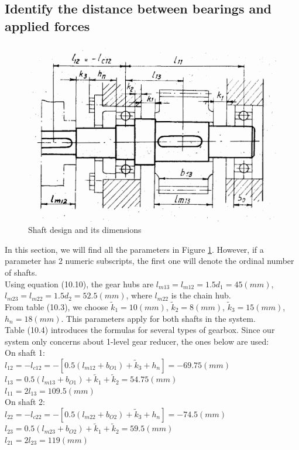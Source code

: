 \subsection{Identify the distance between bearings and applied forces}

\begin{figure}[ht]
	\centering	\includegraphics[width=150mm]{shaft1.png}
	\caption{Shaft design and its dimensions}
	\label{shaft}
\end{figure}

In this section, we will find all the parameters in Figure \ref{shaft}. However, if a parameter has 2 numeric subscripts, the first one will denote the ordinal number of shafts.\\
Using equation (10.10), the gear hubs are $ l_{m13} = l_{m12} = 1.5d_1 =  45\unit{(mm)} $, $ l_{m23} = l_{m22} = 1.5d_2 = 52.5\unit{(mm)} $, where $ l_{m22} $ is the chain hub.\\
From table (10.3), we choose $ \tilde{k}_1=10\unit{(mm)}$, $ \tilde{k}_2=8\unit{(mm)} $, $ \tilde{k}_3=15\unit{(mm)} $, $ h_n=18\unit{(mm)} $. This parameters apply for both shafts in the system.\\
Table (10.4) introduces the formulas for several types of gearbox. Since our system only concerns about 1-level gear reducer, the ones below are used:\\
On shaft 1:\\
$ l_{12} = -l_{c12} = -\left[ 0.5(l_{m12}+b_{O1})+\tilde{k}_3+h_n  \right] = -69.75 \unit{(mm)} $\\
$ l_{13} = 0.5(l_{m13}+b_{O1})+\tilde{k}_1+\tilde{k}_2 = 54.75 \unit{(mm)} $\\
$ l_{11} = 2l_{13} = 109.5 \unit{(mm)}$\\
On shaft 2:\\
$ l_{22} = -l_{c22} = -\left[ 0.5(l_{m22}+b_{O2})+\tilde{k}_3+h_n \right] = -74.5 \unit{(mm)} $\\
$ l_{23} = 0.5(l_{m23}+b_{O2})+\tilde{k}_1+\tilde{k}_2 = 59.5 \unit{(mm)} $\\
$ l_{21} = 2l_{23} = 119 \unit{(mm)}$

